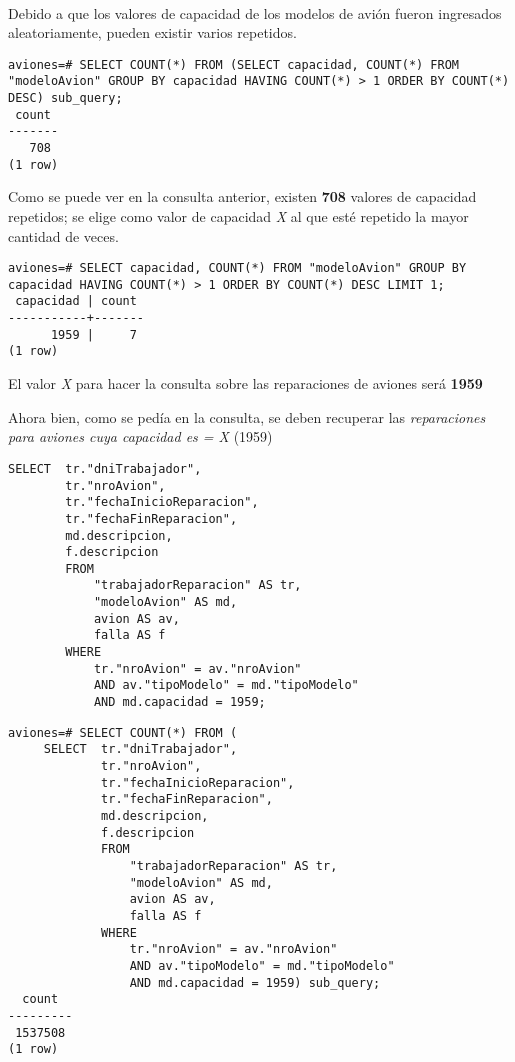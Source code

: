 ~\\

Debido a que los valores de capacidad de los modelos de avión fueron ingresados aleatoriamente, pueden existir varios repetidos.

\vspace*{5mm}
\lstset{style=sql}
\begin{lstlisting}
aviones=# SELECT COUNT(*) FROM (SELECT capacidad, COUNT(*) FROM "modeloAvion" GROUP BY capacidad HAVING COUNT(*) > 1 ORDER BY COUNT(*) DESC) sub_query;
 count 
-------
   708
(1 row)
\end{lstlisting}

Como se puede ver en la consulta anterior, existen \textbf{708} valores de capacidad repetidos; se elige como valor de capacidad \emph{X} al que esté repetido la mayor cantidad de veces.  

\vspace*{5mm}
\lstset{style=sql}
\begin{lstlisting}
aviones=# SELECT capacidad, COUNT(*) FROM "modeloAvion" GROUP BY capacidad HAVING COUNT(*) > 1 ORDER BY COUNT(*) DESC LIMIT 1;
 capacidad | count 
-----------+-------
      1959 |     7
(1 row)
\end{lstlisting}

El valor \emph{X} para hacer la consulta sobre las reparaciones de aviones será \textbf{1959}  


Ahora bien, como se pedía en la consulta, se deben recuperar las \emph{reparaciones para aviones cuya capacidad es = X} (1959) 

\vspace*{5mm}
\lstset{style=sql}
\begin{lstlisting}
SELECT  tr."dniTrabajador", 
        tr."nroAvion",
        tr."fechaInicioReparacion",
        tr."fechaFinReparacion",
        md.descripcion,
        f.descripcion
        FROM 
            "trabajadorReparacion" AS tr,
            "modeloAvion" AS md,
            avion AS av,
            falla AS f
        WHERE
            tr."nroAvion" = av."nroAvion"
            AND av."tipoModelo" = md."tipoModelo"
            AND md.capacidad = 1959;
\end{lstlisting}

\clearpage
\lstset{style=sql}
\begin{lstlisting}
aviones=# SELECT COUNT(*) FROM (
     SELECT  tr."dniTrabajador", 
             tr."nroAvion",
             tr."fechaInicioReparacion",
             tr."fechaFinReparacion",
             md.descripcion,
             f.descripcion
             FROM 
                 "trabajadorReparacion" AS tr,
                 "modeloAvion" AS md,
                 avion AS av,
                 falla AS f
             WHERE
                 tr."nroAvion" = av."nroAvion"
                 AND av."tipoModelo" = md."tipoModelo"
                 AND md.capacidad = 1959) sub_query;
  count  
---------
 1537508
(1 row)
\end{lstlisting}

